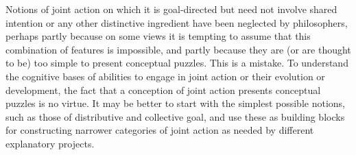 \documentclass[12pt,a4paper]{extarticle}
\begin{document}
Notions of joint action on which it is goal-directed but need not involve shared intention or any other distinctive ingredient have been neglected by philosophers, perhaps 
 partly because on some views it is tempting to assume that this combination of features is impossible, and 
partly because they are (or are thought to be) too simple to present conceptual puzzles.
This is a mistake.  
To understand the cognitive bases of abilities to engage in joint action or their evolution or development, the fact that a conception of joint action presents conceptual puzzles is no virtue.
It may be better to start with the simplest possible notions, such as those of distributive and collective goal, and use these as building blocks for constructing narrower categories of joint action as needed by different explanatory projects.




\begin{comment}

Our approach also provides an argument against other claims made without justification.
Take the claim that each agent of a joint action must believe, or be in a position to know, that she is not acting alone.
Several philosophers have  implied that this claim is true.%
%
\footnote{
Kutz asserts that participants in a joint action have 
`a conception of themselves as contributors to a collective end' (\citeyear[p.\ 10]{Kutz:2000si}).
Similarly, Roth asserts that in joint action `each participant \ldots \ can answer the question of what he is doing or will be doing by saying for example ``We are walking together'' or ``We will/intend to walk together''' 
(\citeyear[p.\ 361]{Roth:2004ki}).
Relatedly, \citet[p. 56]{miller_social_2001} asserts that each agent of a joint action believes that her actions are interdependent with the others'.
If any of these assertions are true then each agent of any joint action either believes or is in a position to know she is not acting alone.
}
%
As far as we know, no arguments have yet been given for these assertions.
 But the construction we have offered provides strong reason to reject this claim.
We are not claiming, of course, that joint actions where the agents do not know that they are not acting alone are 
either teleologically normal or theoretically significant.
It is possible that coordination mechanisms on which effective joint action hinges are such that it is teleologically normal for them to facilitate joint action only when agents intend or expect to coordinate their actions.
If so, there is a sense in which joint actions without some minimal awareness of jointness are not normal, 
and this category of joint action may have limited theoretical significance.
\end{comment}




\label{end_section_conclusion}



\end{document}
